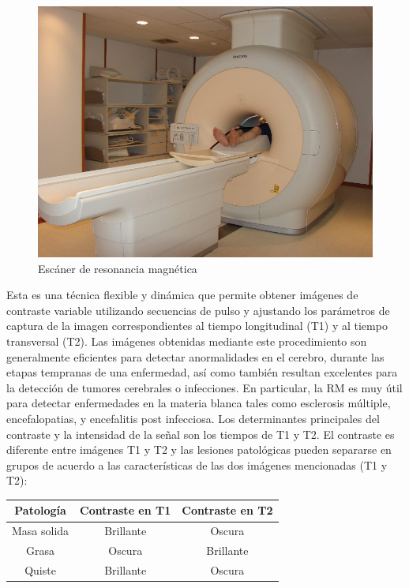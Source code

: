 \begin{figure}[h!]
\centering
\includegraphics[scale=0.3]{images/scanner.jpg}
\caption{Escáner de resonancia magnética}
\label{fig:scanner:mri}
\end{figure}

Esta es una técnica flexible y dinámica que permite obtener imágenes de contraste variable utilizando secuencias de pulso y ajustando los parámetros de captura de la imagen correspondientes al tiempo longitudinal (T1) y al tiempo transversal (T2). Las imágenes obtenidas mediante este procedimiento son generalmente eficientes para detectar anormalidades en el cerebro, durante las etapas tempranas de una enfermedad, así como también resultan excelentes para la detección de tumores cerebrales o infecciones. En particular, la RM es muy útil para detectar enfermedades en la materia blanca tales como esclerosis múltiple, encefalopatias, y encefalitis post infecciosa. Los determinantes principales del contraste y la intensidad de la señal son los tiempos de T1 y T2. El contraste es diferente entre imágenes T1 y T2 y las lesiones patológicas pueden separarse en grupos de acuerdo a las características de las dos imágenes mencionadas (T1 y T2):


\begin{table}[h!]
	\centering
	\begin{tabular}{c|c c}
	Patología & Contraste en T1 & Contraste en T2   \\ 
	\hline Masa solida & Brillante & Oscura  \\ 
	Grasa & Oscura & Brillante  \\ 
	Quiste &	Brillante &	Oscura  \\ 
	\end{tabular} 
\end{table}

